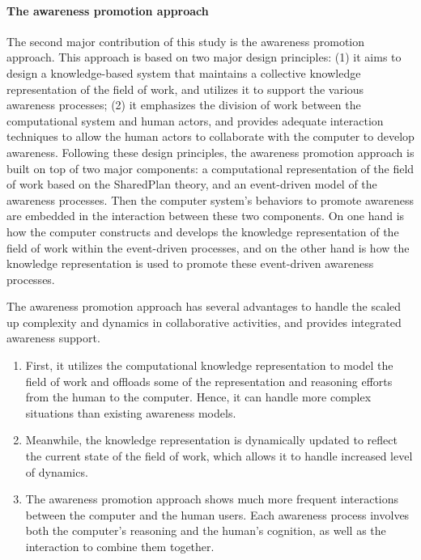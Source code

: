 \paragraph*{The awareness promotion approach} %
\label{par:the_awareness_promotion_approach}
The second major contribution of this study is the awareness promotion approach. This approach is based on two major design principles: (1) it aims to design a knowledge-based system that maintains a collective knowledge representation of the field of work, and utilizes it to support the various awareness processes; (2) it emphasizes the division of work between the computational system and human actors, and provides adequate interaction techniques to allow the human actors to collaborate with the computer to develop awareness. Following these design principles, the awareness promotion approach is built on top of two major components: a computational representation of the field of work based on the SharedPlan theory, and an event-driven model of the awareness processes. Then the computer system’s behaviors to promote awareness are embedded in the interaction between these two components. On one hand is how the computer constructs and develops the knowledge representation of the field of work within the event-driven processes, and on the other hand is how the knowledge representation is used to promote these event-driven awareness processes.

The awareness promotion approach has several advantages to handle the scaled up complexity and dynamics in collaborative activities, and provides integrated awareness support. 

\begin{enumerate}
	\item First, it utilizes the computational knowledge representation to model the field of work and offloads some of the representation and reasoning efforts from the human to the computer. Hence, it can handle more complex situations than existing awareness models.
	\item Meanwhile, the knowledge representation is dynamically updated to reflect the current state of the field of work, which allows it to handle increased level of dynamics.
	\item The awareness promotion approach shows much more frequent interactions between the computer and the human users. Each awareness process involves both the computer’s reasoning and the human’s cognition, as well as the interaction to combine them together.
\end{enumerate}

